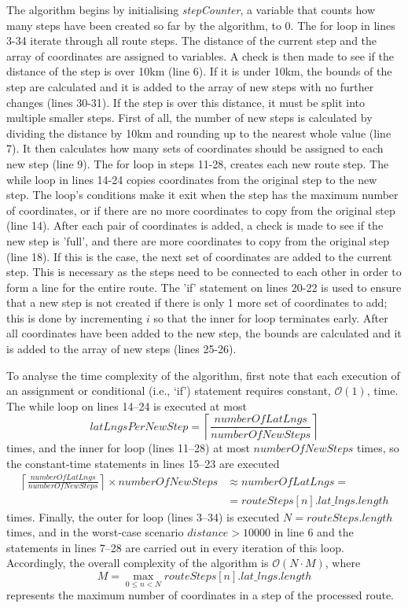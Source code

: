 \documentclass[authoryearcitations]{UoYCSproject}
\begin{document}
The algorithm begins by initialising \textit{stepCounter}, a variable that counts how many steps have been created so far by the algorithm, to 0. The for loop in lines 3-34 iterate through all route steps. The distance of the current step and the array of coordinates are assigned to variables. A check is then made to see if the distance of the step is over 10km (line 6). If it is under 10km, the bounds of the step are calculated and it is added to the array of new steps with no further changes (lines 30-31). If the step is over this distance, it must be split into multiple smaller steps. First of all, the number of new steps is calculated by dividing the distance by 10km and rounding up to the nearest whole value (line 7). It then calculates how many sets of coordinates should be assigned to each new step (line 9). The for loop in steps 11-28, creates each new route step. The while loop in lines 14-24 copies coordinates from the original step to the new step. The loop's conditions make it exit when the step has the maximum number of coordinates, or if there are no more coordinates to copy from the original step (line 14). After each pair of coordinates is added, a check is made to see if the new step is 'full', and there are more coordinates to copy from the original step (line 18). If this is the case, the next set of coordinates are added to the current step. This is necessary as the steps need to be connected to each other in order to form a line for the entire route. The 'if' statement on lines 20-22 is used to ensure that a new step is not created if there is only 1 more set of coordinates to add; this is done by incrementing $i$ so that the inner for loop terminates early. After all coordinates have been added to the new step, the bounds are calculated and it is added to the array of new steps (lines 25-26).

To analyse the time complexity of the algorithm, first note that each execution of an assignment or conditional (i.e., `if') statement requires constant, $\mathcal{O}(1)$, time. The while loop on lines 14--24 is executed at most
\[
  \mathit{latLngsPerNewStep} = \left\lceil \frac{\mathit{numberOfLatLngs}}{\mathit{numberOfNewSteps}}\right\rceil
\] 
times, and the inner for loop (lines 11--28) at most $\mathit{numberOfNewSteps}$ times, so the constant-time statements in lines 15--23 are executed
\[
 \begin{array}{ll}
  \left\lceil \frac{\mathit{numberOfLatLngs}}{\mathit{numberOfNewSteps}}\right\rceil \times \mathit{numberOfNewSteps} & \approx \mathit{numberOfLatLngs} = \\
  & = \mathit{routeSteps[n].lat\_lngs.length}
  \end{array}
\]
times. Finally, the outer for loop (lines 3--34) is executed $N=\mathit{routeSteps.length}$ times, and in the worst-case scenario $\mathit{distance}>10000$ in line 6 and the statements in lines 7--28 are carried out in every iteration of this loop. Accordingly, the overall complexity of the algorithm is $\mathcal{O}(N \cdot M)$, where 
\[
  M = \max_{0\leq n<N} \mathit{routeSteps[n].lat\_lngs.length}
\]
represents the maximum number of coordinates in a step of the processed route.
\end{document}
